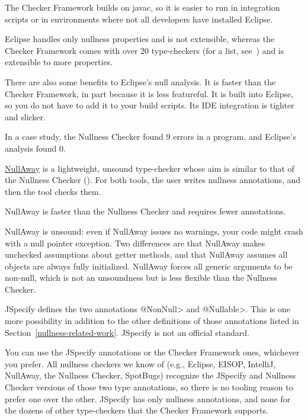 The Checker Framework builds on javac, so it is easier to run in
integration scripts or in
environments where not all developers have installed Eclipse.

Eclipse handles only nullness properties and is not extensible, whereas the
Checker Framework comes with over 20 type-checkers (for a list,
see~) and is extensible to more properties.

There are also some benefits to Eclipse's null analysis.
It is faster than the Checker Framework, in part because it is less featureful.
It is built into Eclipse, so you do not have to add it to your build scripts.
Its IDE integration is tighter and slicker.

In a case study, the Nullness Checker found 9 errors in a program, and
Eclipse's analysis found 0.



\href{https://github.com/uber/NullAway}{NullAway} is a lightweight, unsound
type-checker whose aim is similar to that of the Nullness Checker
().  For both tools, the user writes
nullness annotations, and then the tool checks them.

NullAway is faster than the Nullness Checker and requires fewer annotations.

NullAway is unsound:  even if NullAway issues no warnings, your code might
crash with a null pointer exception.  Two differences are that NullAway
makes unchecked assumptions about getter methods, and that NullAway assumes
all objects are always fully initialized.  NullAway forces all generic
arguments to be non-null, which is not an unsoundness but is less flexible
than the Nullness Checker.



JSpecify defines the two annotations \<@NonNull> and \<@Nullable>.  This is
one more possibility in addition to the other definitions of those
annotations listed in Section~\ref{nullness-related-work}.  JSpecify is not
an official standard.

You can use the JSpecify annotations or the Checker Framework ones,
whichever you prefer.  All nullness checkers we know of (e.g., Eclipse,
EISOP, IntelliJ, NullAway, the Nullness Checker, SpotBugs) recognize the
JSpecify and Nullness Checker versions of those two type annotations, so
there is no tooling reason to prefer one over the other.  JSpecify has only
nullness annotations, and none for the dozens of other type-checkers that
the Checker Framework supports.

